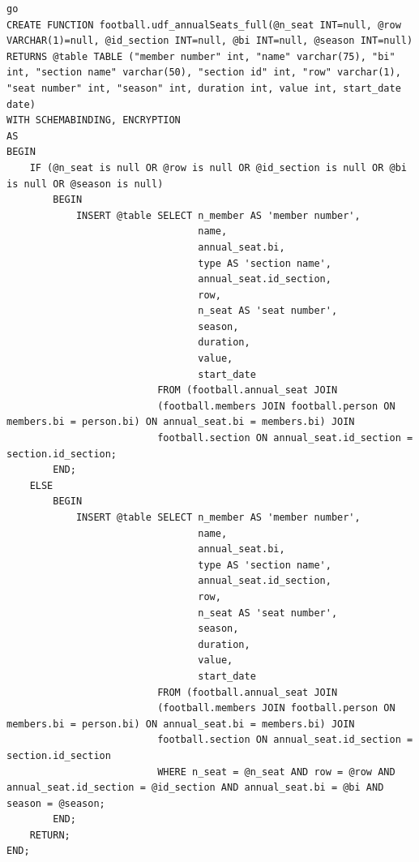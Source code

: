 \documentclass[pdftex,12pt,a4paper]{report}
\begin{document}
\begin{lstlisting}
go
CREATE FUNCTION football.udf_annualSeats_full(@n_seat INT=null, @row VARCHAR(1)=null, @id_section INT=null, @bi INT=null, @season INT=null)
RETURNS @table TABLE ("member number" int, "name" varchar(75), "bi" int, "section name" varchar(50), "section id" int, "row" varchar(1), "seat number" int, "season" int, duration int, value int, start_date date)
WITH SCHEMABINDING, ENCRYPTION
AS
BEGIN
	IF (@n_seat is null OR @row is null OR @id_section is null OR @bi is null OR @season is null)
		BEGIN
			INSERT @table SELECT n_member AS 'member number',
								 name,
								 annual_seat.bi,
								 type AS 'section name',
								 annual_seat.id_section,
								 row, 
								 n_seat AS 'seat number', 
								 season,
								 duration,
								 value,
								 start_date
						  FROM (football.annual_seat JOIN 
						  (football.members JOIN football.person ON members.bi = person.bi) ON annual_seat.bi = members.bi) JOIN
						  football.section ON annual_seat.id_section = section.id_section;
		END;
	ELSE
		BEGIN
			INSERT @table SELECT n_member AS 'member number',
								 name, 
								 annual_seat.bi, 
								 type AS 'section name', 
								 annual_seat.id_section,
								 row, 
								 n_seat AS 'seat number', 
								 season,
								 duration,
								 value,
								 start_date
						  FROM (football.annual_seat JOIN 
						  (football.members JOIN football.person ON members.bi = person.bi) ON annual_seat.bi = members.bi) JOIN
						  football.section ON annual_seat.id_section = section.id_section
						  WHERE n_seat = @n_seat AND row = @row AND annual_seat.id_section = @id_section AND annual_seat.bi = @bi AND season = @season;
		END;
	RETURN;
END;
\end{lstlisting}
\end{document}
